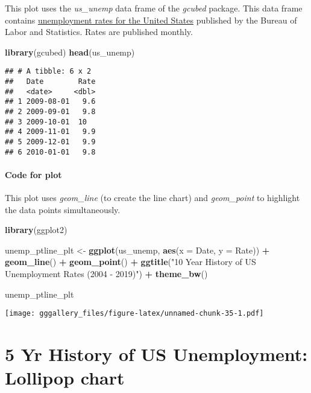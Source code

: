 \documentclass[]{book}
\newenvironment{Shaded}{\begin{snugshade}}{\end{snugshade}}
\newcommand{\DataTypeTok}[1]{\textcolor[rgb]{0.13,0.29,0.53}{#1}}
\newcommand{\KeywordTok}[1]{\textcolor[rgb]{0.13,0.29,0.53}{\textbf{#1}}}
\newcommand{\NormalTok}[1]{#1}
\newcommand{\OperatorTok}[1]{\textcolor[rgb]{0.81,0.36,0.00}{\textbf{#1}}}
\newcommand{\StringTok}[1]{\textcolor[rgb]{0.31,0.60,0.02}{#1}}
\begin{document}
This plot uses the \emph{us\_unemp} data frame of the \emph{gcubed} package. This data frame contains \href{https://data.bls.gov/timeseries/LNS14000000}{unemployment rates for the United States} published by the Bureau of Labor and Statistics. Rates are published monthly.

\begin{Shaded}
\begin{Highlighting}[]
\KeywordTok{library}\NormalTok{(gcubed)}
\KeywordTok{head}\NormalTok{(us_unemp)}
\end{Highlighting}
\end{Shaded}

\begin{verbatim}
## # A tibble: 6 x 2
##   Date        Rate
##   <date>     <dbl>
## 1 2009-08-01   9.6
## 2 2009-09-01   9.8
## 3 2009-10-01  10  
## 4 2009-11-01   9.9
## 5 2009-12-01   9.9
## 6 2010-01-01   9.8
\end{verbatim}

\hypertarget{unemppcode}{%
\subsubsection*{Code for plot}\label{unemppcode}}

This plot uses \emph{geom\_line} (to create the line chart) and \emph{geom\_point} to highlight the data
points simultaneously.

\begin{Shaded}
\begin{Highlighting}[]
\KeywordTok{library}\NormalTok{(ggplot2)}

\NormalTok{unemp_ptline_plt <-}\StringTok{ }\KeywordTok{ggplot}\NormalTok{(us_unemp, }\KeywordTok{aes}\NormalTok{(}\DataTypeTok{x =}\NormalTok{ Date, }\DataTypeTok{y =}\NormalTok{ Rate)) }\OperatorTok{+}\StringTok{ }
\StringTok{  }\KeywordTok{geom_line}\NormalTok{() }\OperatorTok{+}\StringTok{ }\KeywordTok{geom_point}\NormalTok{() }\OperatorTok{+}
\StringTok{  }\KeywordTok{ggtitle}\NormalTok{(}\StringTok{"10 Year History of US Unemployment Rates (2004 - 2019)"}\NormalTok{)  }\OperatorTok{+}
\StringTok{  }\KeywordTok{theme_bw}\NormalTok{()}

\NormalTok{unemp_ptline_plt}
\end{Highlighting}
\end{Shaded}

\texttt{[image: gggallery\_files/figure-latex/unnamed-chunk-35-1.pdf]}

\hypertarget{unemppp}{%
\chapter*{5 Yr History of US Unemployment: Lollipop chart}\label{unemppp}}
\end{document}
